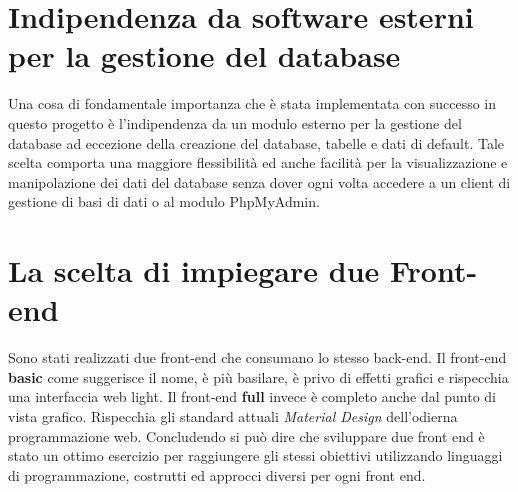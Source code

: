 \section{Indipendenza da software esterni per la gestione del database}
Una cosa di fondamentale importanza che è stata implementata con successo in questo progetto è l'indipendenza da un modulo esterno per la gestione del database ad eccezione della creazione del database, tabelle e dati di default.
Tale scelta comporta una maggiore flessibilità ed anche facilità per la visualizzazione e manipolazione dei dati del database senza dover ogni volta accedere a un client di gestione di basi di dati o al modulo PhpMyAdmin.

\section{La scelta di impiegare due Front-end}
Sono stati realizzati due front-end che consumano lo stesso back-end. \newline
Il front-end \textbf{basic} come suggerisce il nome, è più basilare, è privo di effetti grafici e rispecchia una interfaccia web light. \newline
Il front-end \textbf{full} invece è completo anche dal punto di vista grafico. Rispecchia gli standard attuali \textit{Material Design} dell'odierna programmazione web.
\newline \newline
Concludendo si può dire che sviluppare due front end è stato un ottimo esercizio per raggiungere gli stessi obiettivi utilizzando linguaggi di programmazione, costrutti ed approcci diversi per ogni front end. 


